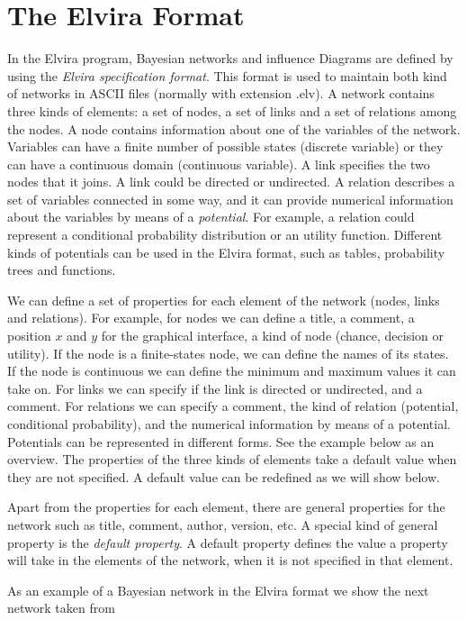 \section{The Elvira Format}
In the Elvira program, Bayesian networks and influence Diagrams are
defined by using the {\em Elvira specification format}. This format
is used to maintain both kind of networks in ASCII files (normally
with extension .elv). A network contains three kinds of elements: a
set of nodes, a set of links and a set of relations among the
nodes. A node contains information about one of the variables of
the network. Variables can have a finite number of possible states
(discrete variable) or they can have a continuous domain
(continuous variable). A link specifies the two nodes that it
joins. A link could be directed or undirected. A relation describes
a set of variables connected in some way, and it can provide
numerical information about the variables by means of a {\em
potential}. For example, a relation could represent a conditional
probability distribution or an utility function. Different kinds of
potentials can be used in the  Elvira format, such as tables,
probability trees and functions.

We can define a set of properties for each element of the network
(nodes, links and relations). For example, for nodes we can define
a title, a comment, a position $x$ and $y$ for the graphical
interface, a kind of node (chance, decision or utility). If the
node is a finite-states node, we can define the names of its
states. If the node is continuous we can define the minimum and
maximum values it can take on. For links we can specify if the link
is directed or undirected, and a comment. For relations we can
specify a comment, the kind of relation (potential, conditional
probability), and the numerical information by means of a potential.
Potentials can be represented in different forms. See the
example below as an overview.
The properties of the three kinds of elements take a default value
when they are not specified. A default value can
be redefined as we will show below.

Apart from the properties for each element, there are general 
properties for the network such as
title, comment, author, version, etc. A special kind of general property is the {\em default property}.
A default property defines the value a property will take in the elements of the network, when
it is not specified in that element.

As an example of a Bayesian network in the Elvira format we show the
next network taken from \cite{coo84}

